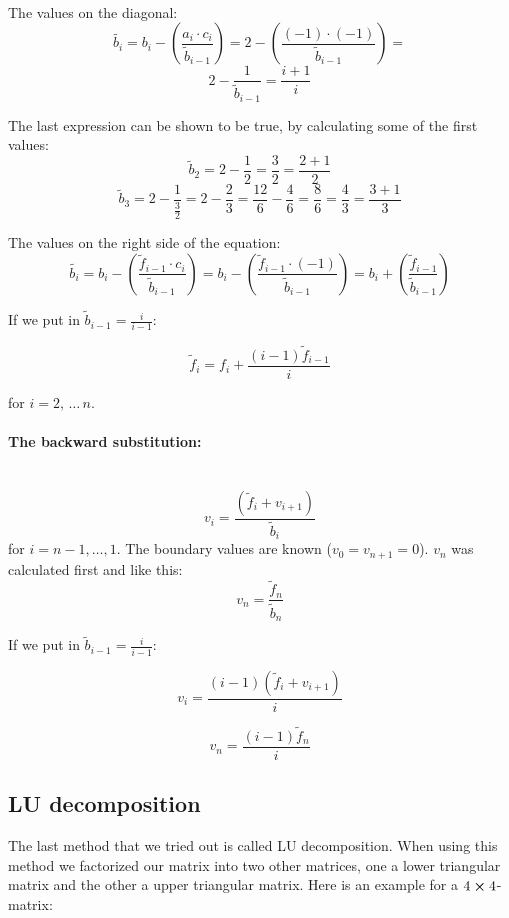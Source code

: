 \hspace{1cm}\\
The values on the diagonal:
\[
\tilde{b_i} =  b_i - \left(\frac{a_i \cdot c_i}{\tilde{b}_{i-1}}\right) = 2 - \left(\frac{(-1) \cdot (-1)}{\tilde{b}_{i-1}}\right) = 
\]
\[
2 - \frac{1}{\tilde{b}_{i-1}} =  \frac{i + 1}{i}
\]

The last expression can be shown to be true, by calculating some of the first values:
\[
\tilde{b}_2 = 2 - \frac{1}{2} = \frac{3}{2} = \frac{2 + 1}{2}
\]
\[
\tilde{b}_3 = 2 - \frac{1}{\frac{3}{2}} = 2 - \frac{2}{3} = \frac{12}{6} - \frac{4}{6} = \frac{8}{6} = \frac{4}{3} = \frac{3+1}{3}
\]

The values on the right side of the equation:
\[
\tilde{b_i} =  b_i - \left(\frac{\tilde{f}_{i-1} \cdot c_i}{\tilde{b}_{i-1}}\right) = b_i - \left(\frac{\tilde{f}_{i-1} \cdot (-1)}{\tilde{b}_{i-1}}\right) = b_i + \left(\frac{\tilde{f}_{i-1}}{\tilde{b}_{i-1}}\right)
\]

If we put in $\tilde{b}_{i-1} = \frac{i}{i-1}$:

\[
\tilde{f}_i = f_i + \frac{(i-1)\tilde{f}_{i-1}}{i}
\]

for $i = 2,\, \dots\, n $.

\paragraph{The backward substitution:}

\hspace{1cm}\\
\[
v_i = \frac{\left(\tilde{f}_i + v_{i+1}\right)}{\tilde{b}_i}
\]
for $i = n-1, \dots, 1 $. The boundary values are known ($v_0 = v_{n+1} = 0$). $v_{n}$ was calculated first and like this:
\[
v_{n} = \frac{\tilde{f}_{n}}{\tilde{b}_{n}}
\]

If we put in $\tilde{b}_{i-1} = \frac{i}{i-1}$:

\[
v_{i} = \frac{(i-1)(\tilde{f}_i + v_{i+1})}{i}
\]

\[
v_n = \frac{(i-1)\tilde{f}_n}{i}
\]


\subsection{LU decomposition}


The last method that we tried out is called LU decomposition. When using this method we factorized our matrix into two other matrices, one a lower triangular matrix and the other a upper triangular matrix. Here is an example for a $ 4 \cross 4$-matrix:

